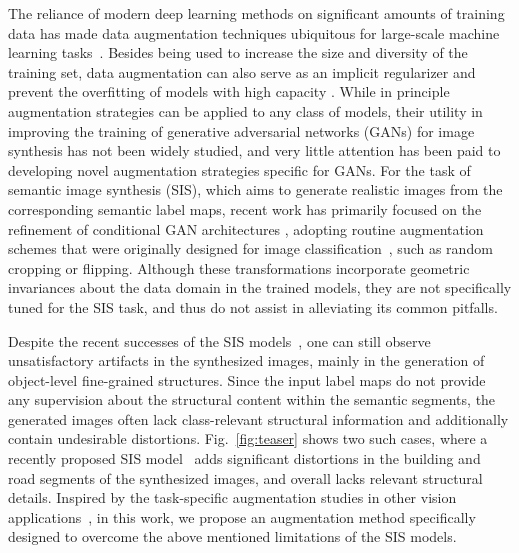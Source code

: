 \documentclass[final]{cvpr}
\newcommand\+{\mkern4mu}
\begin{document}
The reliance of modern deep learning methods on significant amounts of training data has made data augmentation techniques ubiquitous for large-scale machine learning tasks~\cite{Krizhevsky2012ImageNetCW,Szegedy2016RethinkingTI,Ratner2017LearningTC,Taylor2018ImprovingDL,Yun2019CutMixRS}. Besides being used to increase the size and diversity of the training set, data augmentation can also serve as an implicit regularizer and prevent the overfitting of models with high capacity \cite{sajjadi2016regularization,Devries2017ImprovedRO,Berthelot2019MixMatchAH}. 
While in principle augmentation strategies can be applied to any class of models, their utility in improving the training of generative adversarial networks (GANs) for image synthesis has not been widely studied, and very
little attention has been paid to developing novel augmentation strategies specific for GANs.
For the task of semantic image synthesis (SIS), which aims to generate realistic images from the corresponding semantic label maps, recent work has primarily focused on the refinement of conditional GAN architectures \cite{isola2017image,wang2018high,park2019semantic,liu2019learning,tang2019local,Zhu_2020_CVPR}, adopting routine augmentation schemes that were originally designed for image classification~\cite{Krizhevsky2012ImageNetCW}, such as random cropping or flipping.
Although these transformations incorporate geometric invariances about the data domain in the trained models, they are not specifically tuned for the SIS task, and thus do not assist in alleviating its common pitfalls. 

Despite the recent successes of the SIS models~\cite{park2019semantic,liu2019learning,tang2019local,ntavelis2020sesame}, one can still observe unsatisfactory artifacts in the synthesized images, mainly in the generation of object-level fine-grained structures. Since the input label maps do not provide any supervision about the structural content within the semantic segments, the generated images often lack class-relevant structural information and additionally contain undesirable distortions. Fig.~\ref{fig:teaser} shows two such cases, where a recently proposed SIS model~\cite{liu2019learning} adds significant distortions in the building and road segments of the synthesized images, and overall lacks relevant structural details.
Inspired by the task-specific augmentation studies in other vision applications~\cite{dwibedi2017cut,dvornik2018modeling,Singh2017HideandSeekFA,Berthelot2019MixMatchAH,tripathi2019learning}, in this work, we propose an augmentation method specifically designed to overcome the above mentioned limitations of the SIS models.
\end{document}
